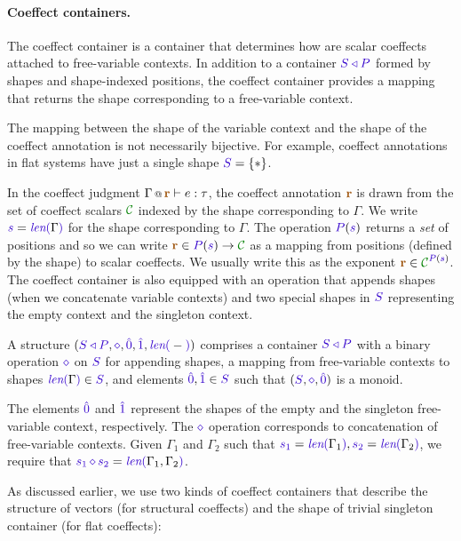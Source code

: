 \paragraph{Coeffect containers.}
The coeffect container is a container that determines how are scalar coeffects attached to 
free-variable contexts. In addition to a container $\SHP$ formed by shapes and shape-indexed positions, 
the coeffect container provides a mapping that returns the shape corresponding to a free-variable context. 

The mapping between the shape of the variable context and the shape of the coeffect annotation
is not necessarily bijective. For example, coeffect annotations in flat systems have just a single 
shape $\SH = \{ \ast \}$.

In the coeffect judgment $\coctx{\Gamma}{\aclrd{\textbf{r}}} \vdash e : \tau$, the coeffect annotation
$\aclrd{\textbf{r}}$ is drawn from the set of coeffect scalars $\C$ indexed by the shape corresponding
to $\Gamma$. We write $\sclrd{s} = \slen{\Gamma}$ for the shape corresponding to $\Gamma$. The operation 
$\SP(\sclrd{s})$ returns a \emph{set} of positions and so we can write $\aclrd{\textbf{r}} \in 
  \SP(\sclrd{s}) \rightarrow \C$  as a mapping from positions (defined by the shape) to scalar coeffects. 
We usually write this as the exponent $\aclrd{\textbf{r}} \in \C^{\SP(\sclrd{s})}$.
The coeffect container is also equipped with an operation that appends shapes (when we concatenate
variable contexts) and two special shapes in $\SH$ representing the empty context and the singleton 
context. 

\begin{definition}
A \emph{} structure $(\SHP, \stimes, \sempty, \sunit, \slen{-})$ 
comprises a container $\SHP$ with a binary operation $\stimes$ on $\SH$ for appending shapes, a 
mapping from free-variable contexts to shapes $\slen{\Gamma} \in \SH$, and elements $\sempty,\sunit \in
\SH$ such that $(\SH, \stimes, \sempty)$ is a monoid.

The elements $\sempty$ and $\sunit$ represent the shapes of the empty and the singleton free-variable 
context, respectively. The $\stimes$ operation corresponds to concatenation of free-variable contexts.
Given $\Gamma_1$ and $\Gamma_2$ such that $\sclrd{s_1}=\slen{\Gamma_1}, \sclrd{s_2}=\slen{\Gamma_2}$, 
we require that $\sclrd{s_1}\,\stimes\,\sclrd{s_2}=\slen{\Gamma_1, \Gamma_2}$. 
\end{definition}

\noindent
As discussed earlier, we use two kinds of coeffect containers that describe the structure of vectors 
(for structural coeffects) and the shape of trivial singleton container (for flat coeffects): 

